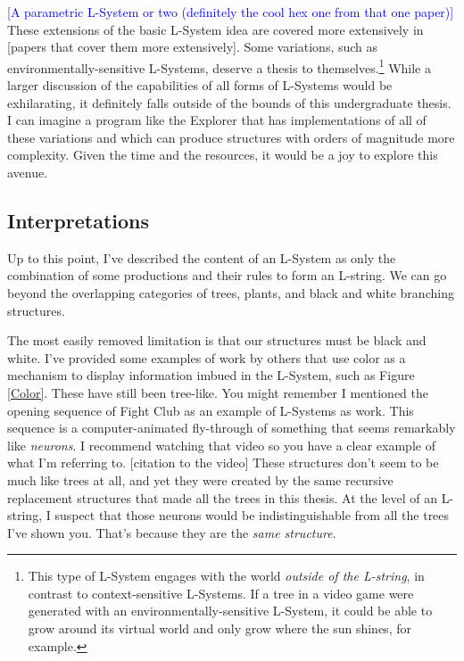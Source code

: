 \documentclass[12pt,twoside]{reedthesis}
\begin{document}
	\textcolor{blue}{[A parametric L-System or two (definitely the cool hex one from that one paper)]}\\
	
	These extensions of the basic L-System idea are covered more extensively in [papers that cover them more extensively]. Some variations, such as environmentally-sensitive L-Systems, deserve a thesis to themselves.\footnote{This type of L-System engages with the world \textit{outside of the L-string}, in contrast to context-sensitive L-Systems. If a tree in a video game were generated with an environmentally-sensitive L-System, it could be able to grow around its virtual world and only grow where the sun shines, for example.} While a larger discussion of the capabilities of all forms of L-Systems would be exhilarating, it definitely falls outside of the bounds of this undergraduate thesis. I can imagine a program like the Explorer that has implementations of all of these variations and which can produce structures with orders of magnitude more complexity. Given the time and the resources, it would be a joy to explore this avenue.
	
	\subsection{Interpretations}
	\label{Interpretations}
	
	Up to this point, I've described the content of an L-System as only the combination of some productions and their rules to form an L-string. We can go beyond the overlapping categories of trees, plants, and black and white branching structures.
	
	The most easily removed limitation is that our structures must be black and white. I've provided some examples of work by others that use color as a mechanism to display information imbued in the L-System, such as Figure \ref{Color}. These have still been tree-like. You might remember I mentioned the opening sequence of Fight Club as an example of L-Systems as work. This sequence is a computer-animated fly-through of something that seems remarkably like \textit{neurons}. I recommend watching that video so you have a clear example of what I'm referring to. [citation to the video] These structures don't seem to be much like trees at all, and yet they were created by the same recursive replacement structures that made all the trees in this thesis. At the level of an L-string, I suspect that those neurons would be indistinguishable from all the trees I've shown you. That's because they are the \textit{same structure}.\\
	
\end{document}
